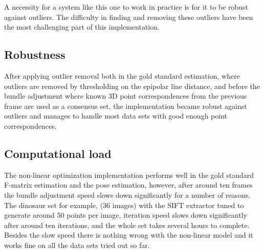 A necessity for a system like this one to work in practice is for it to be robust against outliers. The difficulty in finding and removing these outliers have been the most challenging part of this implementation.

\subsection{Robustness}
After applying outlier removal both in the gold standard estimation, where outliers are removed by thresholding on the epipolar line distance, and before the bundle adjustment where known 3D point correspondences from the previous frame are used as a consensus set, the implementation became robust against outliers and manages to handle most data sets with good enough point correspondences. 

\subsection{Computational load}
The non-linear optimization implementation performs well in the gold standard F-matrix estimation and the pose estimation, however, after around ten frames the bundle adjustment speed slows down significantly for a number of reasons. The dinosaur set for example, (36 images) with the SIFT extractor tuned to generate around 50 points per image, iteration speed slows down significantly after around ten iterations, and the whole set takes several hours to complete. Besides the slow speed there is nothing wrong with the non-linear model and it works fine on all the data sets tried out so far.
